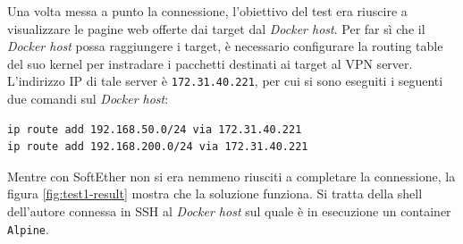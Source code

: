 



Una volta messa a punto la connessione, l'obiettivo del test era riuscire a visualizzare
le pagine web offerte dai target dal \textit{Docker host}.
Per far sì che il \textit{Docker host} possa raggiungere i target, è necessario
configurare la routing table del suo kernel per instradare i pacchetti destinati
ai target al VPN server. L'indirizzo IP di tale server è \texttt{172.31.40.221},
per cui si sono eseguiti i seguenti due comandi sul \textit{Docker host}:
\begin{verbatim}
ip route add 192.168.50.0/24 via 172.31.40.221
ip route add 192.168.200.0/24 via 172.31.40.221
\end{verbatim}

Mentre con SoftEther non si era nemmeno riusciti a completare la connessione, la
figura \ref{fig:test1-result} mostra che la soluzione funziona. Si tratta della
shell dell'autore connessa in SSH al \textit{Docker host} sul quale è in esecuzione un container
\texttt{Alpine}.

